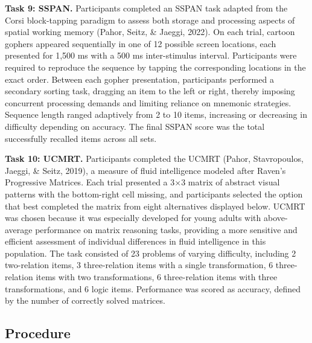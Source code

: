 \documentclass[
  ,man]{apa6}
\begin{document}
\textbf{Task 9: SSPAN.} Participants completed an SSPAN task adapted from the Corsi block-tapping paradigm to assess both storage and processing aspects of spatial working memory (Pahor, Seitz, \& Jaeggi, 2022). On each trial, cartoon gophers appeared sequentially in one of 12 possible screen locations, each presented for 1,500 ms with a 500 ms inter-stimulus interval. Participants were required to reproduce the sequence by tapping the corresponding locations in the exact order. Between each gopher presentation, participants performed a secondary sorting task, dragging an item to the left or right, thereby imposing concurrent processing demands and limiting reliance on mnemonic strategies. Sequence length ranged adaptively from 2 to 10 items, increasing or decreasing in difficulty depending on accuracy. The final SSPAN score was the total successfully recalled items across all sets.

\textbf{Task 10: UCMRT.} Participants completed the UCMRT (Pahor, Stavropoulos, Jaeggi, \& Seitz, 2019), a measure of fluid intelligence modeled after Raven's Progressive Matrices. Each trial presented a 3×3 matrix of abstract visual patterns with the bottom-right cell missing, and participants selected the option that best completed the matrix from eight alternatives displayed below. UCMRT was chosen because it was especially developed for young adults with above-average performance on matrix reasoning tasks, providing a more sensitive and efficient assessment of individual differences in fluid intelligence in this population. The task consisted of 23 problems of varying difficulty, including 2 two-relation items, 3 three-relation items with a single transformation, 6 three-relation items with two transformations, 6 three-relation items with three transformations, and 6 logic items. Performance was scored as accuracy, defined by the number of correctly solved matrices.

\subsection{Procedure}\label{procedure}
\end{document}
